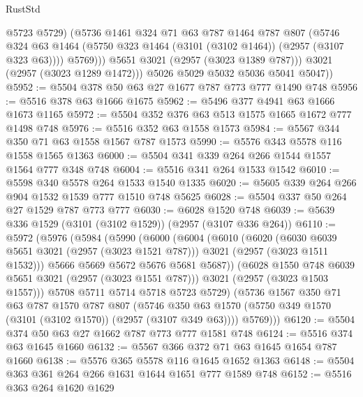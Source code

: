 \begin{lexlean}{RustStd}
\begin{coremodule}
                  @5723
                  @5729)
                (@5736
                  @1461
                  @324
                  @71
                  @63
                  @787
                  @1464
                  @787
                  @807
                  (@5746
                    @324
                    @63
                    @1464
                    (@5750 @323 @1464 (@3101 (@3102 @1464)) (@2957 (@3107 @323 @63))))
                  @5769)))
            @5651
            @3021
            (@2957 (@3023 @1389 @787)))
          @3021
          (@2957 (@3023 @1289 @1472)))
        @5026
        @5029
        @5032
        @5036
        @5041
        @5047))
@5952 := @5504 @378 @50 @63 @27 @1677 @787 @773 @777 @1490 @748
@5956 := @5516 @378 @63 @1666 @1675
@5962 := @5496 @377 @4941 @63 @1666 @1673 @1165
@5972 := @5504 @352 @376 @63 @513 @1575 @1665 @1672 @777 @1498 @748
@5976 := @5516 @352 @63 @1558 @1573
@5984 := @5567 @344 @350 @71 @63 @1558 @1567 @787 @1573
@5990 := @5576 @343 @5578 @116 @1558 @1565 @1363
@6000 := @5504 @341 @339 @264 @266 @1544 @1557 @1564 @777 @348 @748
@6004 := @5516 @341 @264 @1533 @1542
@6010 := @5598 @340 @5578 @264 @1533 @1540 @1335
@6020 := @5605 @339 @264 @266 @904 @1532 @1539 @777 @1510 @748 @5625
@6028 := @5504 @337 @50 @264 @27 @1529 @787 @773 @777
@6030 := @6028 @1520 @748
@6039 := @5639 @336 @1529 (@3101 (@3102 @1529)) (@2957 (@3107 @336 @264))
@6110 := @5972
    (@5976
      (@5984
        (@5990
          (@6000
            (@6004
              (@6010
                (@6020
                  (@6030 @6039 @5651 @3021 (@2957 (@3023 @1521 @787)))
                  @3021
                  (@2957 (@3023 @1511 @1532)))
                @5666
                @5669
                @5672
                @5676
                @5681
                @5687))
            (@6028 @1550 @748 @6039 @5651 @3021 (@2957 (@3023 @1551 @787)))
            @3021
            (@2957 (@3023 @1503 @1557)))
          @5708
          @5711
          @5714
          @5718
          @5723
          @5729)
        (@5736
          @1567
          @350
          @71
          @63
          @787
          @1570
          @787
          @807
          (@5746 @350 @63 @1570 (@5750 @349 @1570 (@3101 (@3102 @1570)) (@2957 (@3107 @349 @63))))
          @5769)))
@6120 := @5504 @374 @50 @63 @27 @1662 @787 @773 @777 @1581 @748
@6124 := @5516 @374 @63 @1645 @1660
@6132 := @5567 @366 @372 @71 @63 @1645 @1654 @787 @1660
@6138 := @5576 @365 @5578 @116 @1645 @1652 @1363
@6148 := @5504 @363 @361 @264 @266 @1631 @1644 @1651 @777 @1589 @748
@6152 := @5516 @363 @264 @1620 @1629

\end{coremodule}
\end{lexlean}
